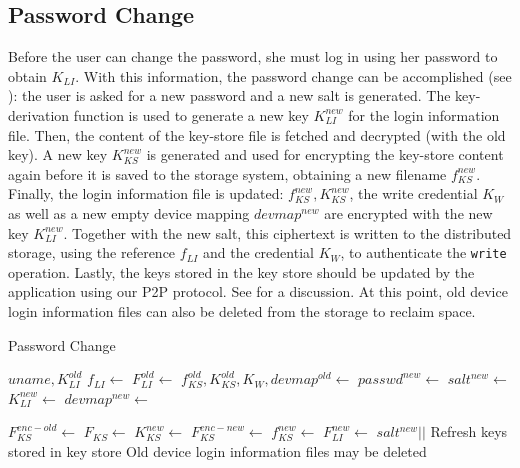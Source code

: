 \subsection{Password Change} 
Before the user can change the password, she must log in using her password to obtain $K_{LI}$.
With this information, the password change can be accomplished (see
): the user is asked for a new password and a new salt is generated. The key-derivation function is used to generate a new key $K_{LI}^{new}$ for the login information file. Then, the content of the key-store file is fetched and decrypted (with the old key). A new key $K_{KS}^{new}$ is generated and used for encrypting the key-store content again before it is saved to the storage system, obtaining a new filename $f_{KS}^{new}$. Finally, the login information file is updated: $f_{KS}^{new}, K_{KS}^{new}$, the write credential $K_W$ as well as a new empty device mapping $devmap^{new}$ are encrypted with the new key $K_{LI}^{new}$. Together with the new salt, this ciphertext is written to the distributed storage, using the reference $f_{LI}$ and the credential $K_W$, to authenticate the \texttt{write} operation.
Lastly, the keys stored in the key store should be updated by the application
using our P2P protocol. See  for a discussion. At this
point, old device login information files can also be deleted from the storage to
reclaim space.

\begin{algorithm}
\caption{Password Change}
\begin{algorithmic}[\LineNumFrequency]
\Input $uname, K_{LI}^{old}$
\State $f_{LI} \gets$ 
\State $F_{LI}^{old} \gets$ 
\State $f_{KS}^{old},K_{KS}^{old},K_W,devmap^{old} \gets$  
\State $passwd^{new} \gets$ 
\State $salt^{new} \gets$ \NewSalt
\State $K_{LI}^{new} \gets$ 
\State $devmap^{new} \gets$ \NewMap

\State $F_{KS}^{enc-old} \gets$ 
\State $F_{KS} \gets$ 
\State $K_{KS}^{new} \gets$ \NewKey
\State $F_{KS}^{enc-new} \gets$ 
\State $f_{KS}^{new} \gets$  %
\State $F_{LI}^{new} \gets$
\Statex $salt^{new} ||$ 
\State {} 
\State Refresh keys stored in key store
\State Old device login information files may be deleted
\end{algorithmic}
\end{algorithm}



